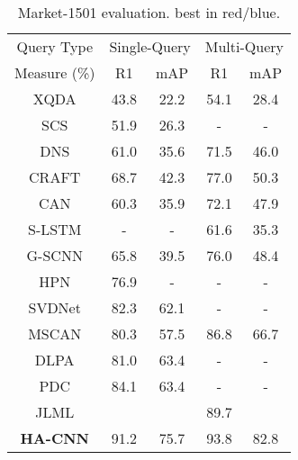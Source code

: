 \documentclass[10pt,twocolumn,letterpaper]{article}
\begin{document}
\begin{table} \centering
\renewcommand{\arraystretch}{1}
	\setlength{\tabcolsep}{0.28 cm} 
\caption{Market-1501 evaluation.  best in red/blue.
}
\begin{tabular}{|c|cc|cc|}
		\hline
		Query Type &  \multicolumn{2}{c|}{Single-Query} &\multicolumn{2}{c|}{Multi-Query} \\ \cline{1-5}
		Measure (\%)    & R1 & mAP & R1 & mAP  \\ \hline \hline
		XQDA\cite{liao2015person} &  43.8 &  22.2  &  54.1 &  28.4\\   SCS\cite{chen2016similarity} &  51.9 &  26.3 &  - &  -  \\  DNS\cite{zhang2016learning} & 61.0 & 35.6  &  71.5 &  46.0  \\ 
		CRAFT\cite{chen2017person} & 68.7 & 42.3  &  77.0 &  50.3  \\ 
		\hline
		CAN\cite{liu2017end} & 60.3 & 35.9  & 72.1 &  47.9  \\ 
		S-LSTM\cite{varior2016siamese} & - & -  & 61.6 &  35.3  \\ 
		G-SCNN\cite{varior2016gated} & 65.8 & 39.5  & 76.0 &  48.4  \\ 
		HPN \cite{liu2017hydraplus} & 76.9 & -  & - &  -  \\ 
		SVDNet \cite{sun2017svdnet}&  82.3 &  62.1 &- & -  \\ 
\hline
		MSCAN \cite{li2017learning} & 80.3 & 57.5  &86.8 &  66.7  \\
		DLPA \cite{zhao2017deeply} & 81.0 & 63.4  & - &  -  \\ 
		PDC \cite{su2017pose} & 84.1 & 63.4  & - &  -  \\ 
		JLML \cite{li2017person} 
		& \color{blue}{85.1} &  \color{blue}{65.5}  & \color{blue} {89.7} & \color{blue}{74.5}  \\
\hline
{\bf HA-CNN} & \color{red} {91.2} &  \color{red} {75.7}  &   \color{red} {93.8} &   \color{red} {82.8}  \\ 
		\hline
	\end{tabular}\label{tab:res_market}
	\vspace{-0.35cm}
\end{table}
\vspace{0.05cm}
\end{document}
